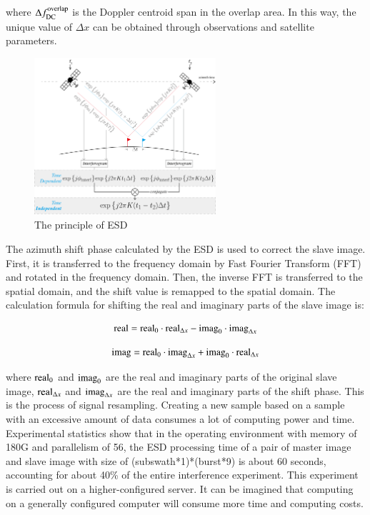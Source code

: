 \documentclass[preprint, authoryear]{elsarticle}
\begin{document}
\noindent where $\Delta f_{\rm DC}^{\rm overlap}$ is the Doppler centroid span in the overlap area. In this way, the unique value of $\Delta x$ can be obtained through observations and satellite parameters. \par

\begin{figure}
	\centering 
	\includegraphics[width=0.6\textwidth]{figure/The principle of ESD.png}	
	\caption{The principle of ESD} 
	\label{fig_2}%
\end{figure}

The azimuth shift phase calculated by the ESD is used to correct the slave image. First, it is transferred to the frequency domain by Fast Fourier Transform (FFT) and rotated in the frequency domain. Then, the inverse FFT is transferred to the spatial domain, and the shift value is remapped to the spatial domain. The calculation formula for shifting the real and imaginary parts of the slave image is: \par

\begin{equation}
    {\rm real} = {\rm real}_0 \cdot {\rm real}_{\Delta x} - {\rm imag}_0 \cdot {\rm imag}_{\Delta x}
    \label{eq_4}
\end{equation}

\begin{equation}
    {\rm imag} = {\rm real}_0 \cdot {\rm imag}_{\Delta x} + {\rm imag}_0 \cdot {\rm real}_{\Delta x}
    \label{eq_5}
\end{equation}

\noindent where ${\rm real}_0$ and ${\rm imag}_0$ are the real and imaginary parts of the original slave image, ${\rm real}_{\Delta x}$ and ${\rm imag}_{\Delta x}$ are the real and imaginary parts of the shift phase. This is the process of signal resampling. Creating a new sample based on a sample with an excessive amount of data consumes a lot of computing power and time. Experimental statistics show that in the operating environment with memory of 180G and parallelism of 56, the ESD processing time of a pair of master image and slave image with size of (subswath*1)*(burst*9) is about 60 seconds, accounting for about 40\% of the entire interference experiment. This experiment is carried out on a higher-configured server. It can be imagined that computing on a generally configured computer will consume more time and computing costs. \par
\end{document}
